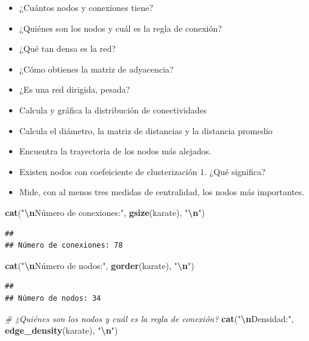 \documentclass[
]{article}
\newenvironment{Shaded}{\begin{snugshade}}{\end{snugshade}}
\newcommand{\CommentTok}[1]{\textcolor[rgb]{0.56,0.35,0.01}{\textit{#1}}}
\newcommand{\FunctionTok}[1]{\textcolor[rgb]{0.13,0.29,0.53}{\textbf{#1}}}
\newcommand{\NormalTok}[1]{#1}
\newcommand{\SpecialCharTok}[1]{\textcolor[rgb]{0.81,0.36,0.00}{\textbf{#1}}}
\newcommand{\StringTok}[1]{\textcolor[rgb]{0.31,0.60,0.02}{#1}}
\providecommand{\tightlist}{%
  \setlength{\itemsep}{0pt}\setlength{\parskip}{0pt}}
\begin{document}
\begin{itemize}
\tightlist
\item
  ¿Cuántos nodos y conexiones tiene?
\item
  ¿Quiénes son los nodos y cuál es la regla de conexión?
\item
  ¿Qué tan densa es la red?
\item
  ¿Cómo obtienes la matriz de adyacencia?
\item
  ¿Es una red dirigida, pesada?
\item
  Calcula y gráfica la distribución de conectividades
\item
  Calcula el diámetro, la matriz de distancias y la distancia promedio
\item
  Encuentra la trayectoria de los nodos más alejados.
\item
  Existen nodos con coefeiciente de clusterización 1. ¿Qué significa?
\item
  Mide, con al menos tres medidas de centralidad, los nodos más
  importantes.
\end{itemize}

\begin{Shaded}
\begin{Highlighting}[]
\FunctionTok{cat}\NormalTok{(}\StringTok{"}\SpecialCharTok{\textbackslash{}n}\StringTok{Número de conexiones:"}\NormalTok{, }\FunctionTok{gsize}\NormalTok{(karate), }\StringTok{"}\SpecialCharTok{\textbackslash{}n}\StringTok{"}\NormalTok{) }
\end{Highlighting}
\end{Shaded}

\begin{verbatim}
## 
## Número de conexiones: 78
\end{verbatim}

\begin{Shaded}
\begin{Highlighting}[]
\FunctionTok{cat}\NormalTok{(}\StringTok{"}\SpecialCharTok{\textbackslash{}n}\StringTok{Número de nodos:"}\NormalTok{, }\FunctionTok{gorder}\NormalTok{(karate), }\StringTok{"}\SpecialCharTok{\textbackslash{}n}\StringTok{"}\NormalTok{)}
\end{Highlighting}
\end{Shaded}

\begin{verbatim}
## 
## Número de nodos: 34
\end{verbatim}

\begin{Shaded}
\begin{Highlighting}[]
\CommentTok{\# ¿Quiénes son los nodos y cuál es la regla de conexión?}
\FunctionTok{cat}\NormalTok{(}\StringTok{"}\SpecialCharTok{\textbackslash{}n}\StringTok{Densidad:"}\NormalTok{, }\FunctionTok{edge\_density}\NormalTok{(karate), }\StringTok{"}\SpecialCharTok{\textbackslash{}n}\StringTok{"}\NormalTok{)}
\end{Highlighting}
\end{Shaded}
\end{document}
